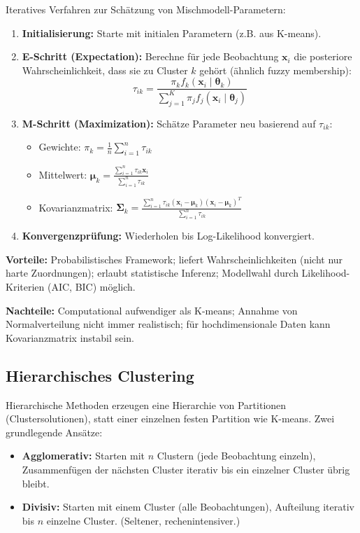 Iteratives Verfahren zur Schätzung von Mischmodell-Parametern:
\begin{enumerate}[leftmargin=1.5em]
    \item \textbf{Initialisierung:} Starte mit initialen Parametern (z.B. aus K-means).
    \item \textbf{E-Schritt (Expectation):} Berechne für jede Beobachtung $\mathbf{x}_i$ die posteriore Wahrscheinlichkeit, dass sie zu Cluster $k$ gehört (ähnlich fuzzy membership):
    $$\tau_{ik} = \frac{\pi_k f_k(\mathbf{x}_i \mid \boldsymbol{\theta}_k)}{\sum_{j=1}^{K} \pi_j f_j(\mathbf{x}_i \mid \boldsymbol{\theta}_j)}$$
    \item \textbf{M-Schritt (Maximization):} Schätze Parameter neu basierend auf $\tau_{ik}$:
    \begin{itemize}
        \item Gewichte: $\pi_k = \frac{1}{n}\sum_{i=1}^{n} \tau_{ik}$
        \item Mittelwert: $\boldsymbol{\mu}_k = \frac{\sum_{i=1}^{n} \tau_{ik} \mathbf{x}_i}{\sum_{i=1}^{n} \tau_{ik}}$
        \item Kovarianzmatrix: $\boldsymbol{\Sigma}_k = \frac{\sum_{i=1}^{n} \tau_{ik} (\mathbf{x}_i - \boldsymbol{\mu}_k)(\mathbf{x}_i - \boldsymbol{\mu}_k)^T}{\sum_{i=1}^{n} \tau_{ik}}$
    \end{itemize}
    \item \textbf{Konvergenzprüfung:} Wiederholen bis Log-Likelihood konvergiert.
\end{enumerate}

\textbf{Vorteile:} Probabilistisches Framework; liefert Wahrscheinlichkeiten (nicht nur harte Zuordnungen); erlaubt statistische Inferenz; Modellwahl durch Likelihood-Kriterien (AIC, BIC) möglich.

\textbf{Nachteile:} Computational aufwendiger als K-means; Annahme von Normalverteilung nicht immer realistisch; für hochdimensionale Daten kann Kovarianzmatrix instabil sein.

\newpage

\subsection{Hierarchisches Clustering}

Hierarchische Methoden erzeugen eine Hierarchie von Partitionen (Clustersolutionen), statt einer einzelnen festen Partition wie K-means. Zwei grundlegende Ansätze:
\begin{itemize}[leftmargin=1.5em]
    \item \textbf{Agglomerativ:} Starten mit $n$ Clustern (jede Beobachtung einzeln), Zusammenfügen der nächsten Cluster iterativ bis ein einzelner Cluster übrig bleibt.
    \item \textbf{Divisiv:} Starten mit einem Cluster (alle Beobachtungen), Aufteilung iterativ bis $n$ einzelne Cluster. (Seltener, rechenintensiver.)
\end{itemize}

